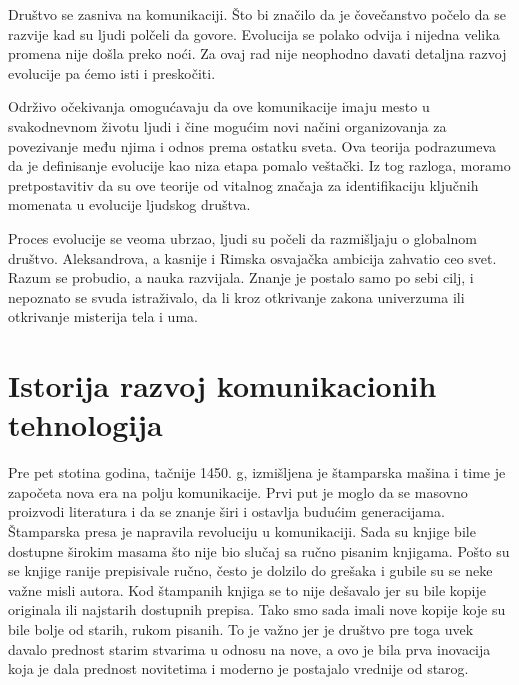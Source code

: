 \documentclass[12pt]{article}
\begin{document}
	Društvo se zasniva na komunikaciji. Što bi značilo da je čovečanstvo počelo da se razvije kad su ljudi polčeli da govore. Evolucija se polako odvija i nijedna velika promena nije došla preko noći. Za ovaj rad nije neophodno davati detaljna razvoj evolucije pa ćemo isti i preskočiti. 
	
	Održivo očekivanja omogućavaju da ove komunikacije imaju mesto u svakodnevnom životu ljudi i čine mogućim novi načini organizovanja za povezivanje među njima i odnos prema ostatku sveta. Ova teorija podrazumeva da je definisanje evolucije kao niza etapa pomalo veštački. Iz tog razloga, moramo pretpostavitiv da su ove teorije od vitalnog značaja za identifikaciju ključnih momenata u evolucije ljudskog društva.
	
	Proces evolucije se veoma ubrzao, ljudi su počeli da razmišljaju o globalnom društvo.  Aleksandrova, a kasnije i Rimska osvajačka ambicija zahvatio ceo svet. Razum se probudio, a nauka razvijala.  Znanje je postalo samo po sebi cilj, i nepoznato se svuda istraživalo, da li kroz otkrivanje zakona univerzuma ili otkrivanje misterija tela i uma.
    
    \section{Istorija razvoj komunikacionih tehnologija}
    
    Pre pet stotina godina, tačnije 1450. g, izmišljena je štamparska mašina i time je započeta nova era na polju komunikacije. Prvi put je moglo da se masovno proizvodi literatura i da se znanje širi i ostavlja budućim generacijama. Štamparska presa je napravila revoluciju u komunikaciji. Sada su knjige bile dostupne širokim masama što nije bio slučaj sa ručno pisanim knjigama. Pošto su se knjige ranije prepisivale ručno, često je dolzilo do grešaka i gubile su se neke važne misli autora. Kod štampanih knjiga se to nije dešavalo jer su bile kopije originala ili najstarih dostupnih prepisa. Tako smo sada imali nove kopije koje su bile bolje od starih, rukom pisanih. To je važno jer je društvo pre toga uvek davalo prednost starim stvarima u odnosu na nove, a ovo je bila prva inovacija koja je dala prednost novitetima i moderno je postajalo vrednije od starog.
    
\end{document}
